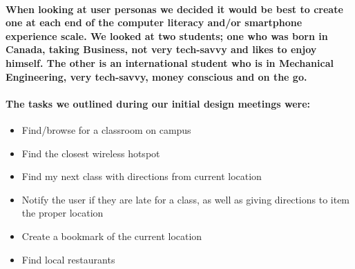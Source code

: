 \documentclass{report}
\begin{document}
    \paragraph{When looking at user personas we decided it would be best to
    create one at each end of the computer literacy and/or smartphone experience
    scale. We looked at two students; one who was born in Canada, taking Business,
    not very tech-savvy and likes to enjoy himself. The other is an international
    student who is in Mechanical Engineering, very tech-savvy, money conscious and
    on the go.}
    \paragraph{The tasks we outlined during our initial design meetings were:}
    \begin{itemize}
    \item Find/browse for a classroom on campus
    \item Find the closest wireless hotspot
    \item Find my next class with directions from current location
    \item Notify the user if they are late for a class, as well as giving directions to
    item the proper location
    \item Create a bookmark of the current location
    \item Find local restaurants
    \end{itemize}
\end{document}
